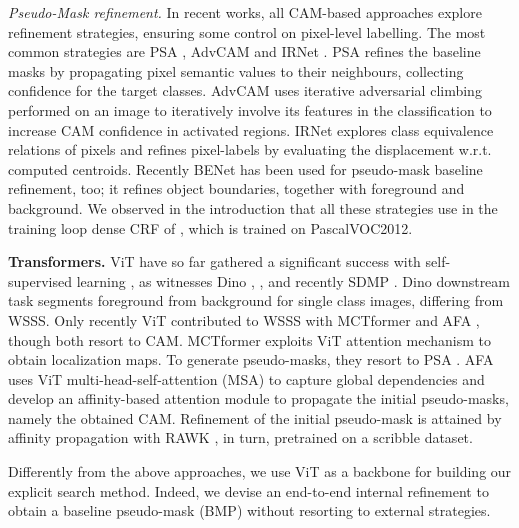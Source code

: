 \documentclass[runningheads]{styles/llncs}
\begin{document}
\noindent
{\em Pseudo-Mask refinement.} In recent works, all CAM-based approaches explore refinement strategies, ensuring some control on pixel-level labelling. The most common strategies are PSA \cite{ahn2018learning},  AdvCAM \cite{lee2021anti} and IRNet \cite{ahn2019weakly}. PSA  refines the baseline masks by propagating pixel semantic values to their neighbours, collecting confidence for the target classes. AdvCAM \cite{lee2021anti} uses iterative adversarial climbing performed on an image to iteratively involve its features in the classification to increase CAM confidence in activated regions. IRNet \cite{ahn2019weakly} explores class equivalence relations of pixels and refines pixel-labels by evaluating the displacement w.r.t. computed centroids. 
Recently BENet \cite{chen2020weakly} has been used for pseudo-mask baseline refinement, too; it refines object boundaries, together with foreground and background. We observed in the introduction that all these strategies use in the training loop dense CRF of \cite{krahenbuhl2011efficient}, which is trained on PascalVOC2012.


 
\baselineskip
\noindent
{\bf Transformers.} ViT have so far gathered a significant success with self-supervised learning \cite{dosovitskiy2021image}, as witnesses Dino \cite{caron2021emerging}, \cite{chen2021empirical,li2021efficient}, and recently SDMP \cite{ren2022simple}.  Dino \cite{caron2021emerging} downstream task segments foreground from background for single class images, differing from WSSS. Only recently ViT contributed to WSSS with MCTformer \cite{xu2022multi} and AFA \cite{ru2022learning}, though both resort to CAM. MCTformer exploits ViT attention mechanism to obtain localization maps. To generate pseudo-masks, they resort to PSA \cite{ahn2018learning}. AFA uses ViT multi-head-self-attention (MSA) to capture global dependencies and develop an affinity-based attention module to propagate the initial pseudo-masks, namely the obtained CAM. Refinement of the initial pseudo-mask is attained by affinity propagation with RAWK \cite{vernaza2017learning}, in turn, pretrained on a scribble dataset. 

Differently from the above approaches, we use ViT as a backbone for building our explicit search method. Indeed, we devise an end-to-end internal refinement to obtain a baseline pseudo-mask (BMP) without resorting to external strategies. 
\end{document}
